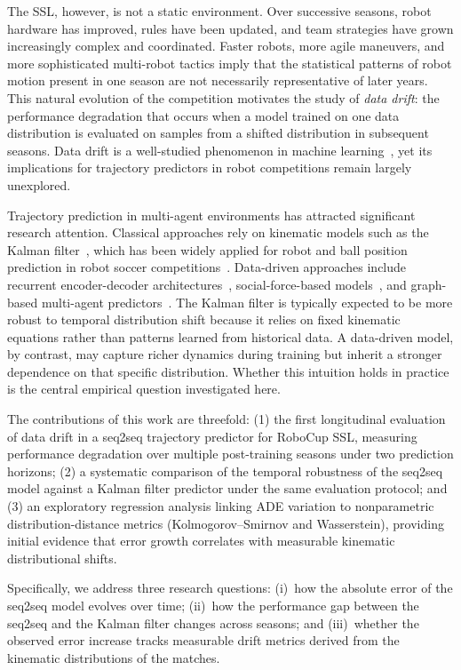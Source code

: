 \documentclass[runningheads]{llncs}
\begin{document}
The SSL, however, is not a static environment. Over successive seasons, robot hardware has improved, rules have been updated, and team strategies have grown increasingly complex and coordinated. Faster robots, more agile maneuvers, and more sophisticated multi-robot tactics imply that the statistical patterns of robot motion present in one season are not necessarily representative of later years. This natural evolution of the competition motivates the study of \textit{data drift}: the performance degradation that occurs when a model trained on one data distribution is evaluated on samples from a shifted distribution in subsequent seasons. Data drift is a well-studied phenomenon in machine learning~\cite{gama2014}, yet its implications for trajectory predictors in robot competitions remain largely unexplored.

Trajectory prediction in multi-agent environments has attracted significant research attention. Classical approaches rely on kinematic models such as the Kalman filter~\cite{kalman}, which has been widely applied for robot and ball position prediction in robot soccer competitions~\cite{yan2014,yuan2015,ryang2016}. Data-driven approaches include recurrent encoder-decoder architectures~\cite{seq2seq,sutskever}, social-force-based models~\cite{alahi2016}, and graph-based multi-agent predictors~\cite{salzmann2020}. The Kalman filter is typically expected to be more robust to temporal distribution shift because it relies on fixed kinematic equations rather than patterns learned from historical data. A data-driven model, by contrast, may capture richer dynamics during training but inherit a stronger dependence on that specific distribution. Whether this intuition holds in practice is the central empirical question investigated here.

The contributions of this work are threefold: (1) the first longitudinal evaluation of data drift in a seq2seq trajectory predictor for RoboCup SSL, measuring performance degradation over multiple post-training seasons under two prediction horizons; (2) a systematic comparison of the temporal robustness of the seq2seq model against a Kalman filter predictor under the same evaluation protocol; and (3) an exploratory regression analysis linking ADE variation to nonparametric distribution-distance metrics (Kolmogorov--Smirnov and Wasserstein), providing initial evidence that error growth correlates with measurable kinematic distributional shifts.

Specifically, we address three research questions: (i)~how the absolute error of the seq2seq model evolves over time; (ii)~how the performance gap between the seq2seq and the Kalman filter changes across seasons; and (iii)~whether the observed error increase tracks measurable drift metrics derived from the kinematic distributions of the matches.
\end{document}
